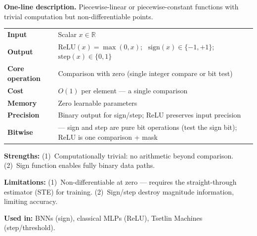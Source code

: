 \begin{speccard}[title={\textcolor{bitblue}{Block 10: Hard Activations (ReLU, Sign, Step)}
  \hfill\normalfont\small\textit{Introduced in \cref{sec:traditional-neuron}, \cref{sec:bnn}}}]

\textbf{One-line description.}\quad
Piecewise-linear or piecewise-constant functions with trivial
computation but non-differentiable points.

\smallskip
\begin{tabular}{@{}l@{\hskip 1.2em}p{10cm}@{}}
\textbf{Input} & Scalar $x \in \mathbb{R}$ \\
\textbf{Output} & $\text{ReLU}(x) = \max(0, x)$; \
  $\text{sign}(x) \in \{-1, +1\}$; \
  $\text{step}(x) \in \{0, 1\}$ \\
\textbf{Core operation} &
  Comparison with zero (single integer compare or bit test) \\
\textbf{Cost} & $O(1)$ per element --- a single comparison \\
\textbf{Memory} & Zero learnable parameters \\
\textbf{Precision} & Binary output for sign/step; ReLU preserves
  input precision \\
\textbf{Bitwise} & \starmark{3} --- sign and step are pure bit
  operations (test the sign bit); ReLU is one comparison + mask \\
\end{tabular}

\smallskip
\textbf{Strengths:}
(1)~Computationally trivial: no arithmetic beyond comparison.
(2)~Sign function enables fully binary data paths.

\textbf{Limitations:}
(1)~Non-differentiable at zero --- requires the straight-through
  estimator (STE) for training.
(2)~Sign/step destroy magnitude information, limiting accuracy.

\textbf{Used in:} BNNs (sign), classical MLPs (ReLU), Tsetlin
Machines (step/threshold).
\end{speccard}

